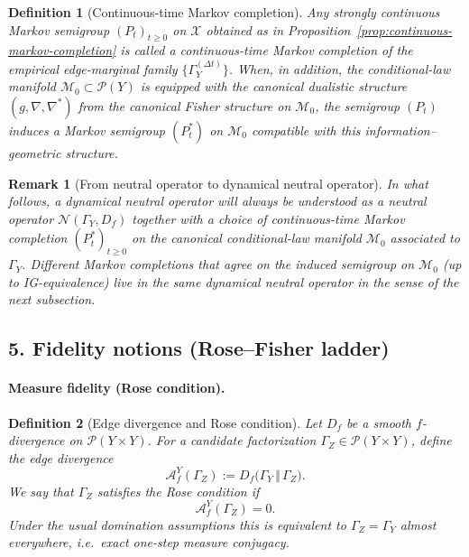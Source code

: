 \documentclass[11pt]{article}
\newtheorem{definition}{Definition}
\newtheorem{remark}{Remark}
\newcommand{\Pcal}{\mathcal{P}}
\newcommand{\Mcal}{\mathcal{M}}
\newcommand{\Ncal}{\mathcal{N}}
\newcommand{\Xcal}{\mathcal{X}}
\begin{document}
\begin{definition}[Continuous-time Markov completion]
\label{def:continuous-markov-completion}
Any strongly continuous Markov semigroup $(P_t)_{t\ge 0}$ on $\Xcal$
obtained as in Proposition~\ref{prop:continuous-markov-completion} is
called a \emph{continuous-time Markov completion} of the empirical
edge-marginal family $\{\Gamma_Y^{(\Delta t)}\}$. When, in addition, the
conditional-law manifold $\Mcal_0\subset \Pcal(Y)$ is equipped with the
canonical dualistic structure $(g,\nabla,\nabla^\ast)$ from
the canonical Fisher structure on $\Mcal_0$, the semigroup $(P_t)$ induces a
Markov semigroup $(P_t^\ast)$ on $\Mcal_0$ compatible with this
information--geometric structure.
\end{definition}

\begin{remark}[From neutral operator to dynamical neutral operator]
\label{rmk:from-neutral-to-dyn}
In what follows, a \emph{dynamical neutral operator} will always be
understood as a neutral operator $\Ncal(\Gamma_Y,D_f)$ together with a
choice of continuous-time Markov completion $(P_t^\ast)_{t\ge 0}$ on the
canonical conditional-law manifold $\Mcal_0$ associated to
$\Gamma_Y$. Different Markov completions that agree on the induced
semigroup on $\Mcal_0$ (up to IG-equivalence) live in the same
dynamical neutral operator in the sense of the next subsection.
\end{remark}

\subsection*{5. Fidelity notions (Rose--Fisher ladder)}

\paragraph{Measure fidelity (Rose condition).}

\begin{definition}[Edge divergence and Rose condition]
Let $D_f$ be a smooth $f$-divergence on $\Pcal(Y\times Y)$. For a
candidate factorization $\Gamma_Z\in\Pcal(Y\times Y)$, define the
\emph{edge divergence}
\[
  \mathcal A_f^Y(\Gamma_Z)
  := D_f\bigl(\Gamma_Y \,\Vert\, \Gamma_Z\bigr).
\]
We say that $\Gamma_Z$ satisfies the \emph{Rose condition} if
\[
  \mathcal A_f^Y(\Gamma_Z) = 0.
\]
Under the usual domination assumptions this is equivalent to
$\Gamma_Z=\Gamma_Y$ almost everywhere, i.e.\ exact one-step measure
conjugacy.
\end{definition}
\end{document}
